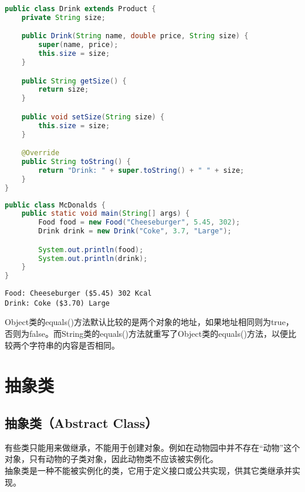 \begin{lstlisting}[language=Java]
public class Drink extends Product {
    private String size;

    public Drink(String name, double price, String size) {
        super(name, price);
        this.size = size;
    }

    public String getSize() {
        return size;
    }

    public void setSize(String size) {
        this.size = size;
    }

    @Override
    public String toString() {
        return "Drink: " + super.toString() + " " + size;
    }
}
\end{lstlisting}

\begin{lstlisting}[language=Java]
public class McDonalds {
    public static void main(String[] args) {
        Food food = new Food("Cheeseburger", 5.45, 302);
        Drink drink = new Drink("Coke", 3.7, "Large");

        System.out.println(food);
        System.out.println(drink);
    }
}
\end{lstlisting}

\begin{tcolorbox}
    \begin{verbatim}
Food: Cheeseburger ($5.45) 302 Kcal
Drink: Coke ($3.70) Large
	\end{verbatim}
\end{tcolorbox}

Object类的equals()方法默认比较的是两个对象的地址，如果地址相同则为true，否则为false。而String类的equals()方法就重写了Object类的equals()方法，以便比较两个字符串的内容是否相同。\\

\newpage

\section{抽象类}

\subsection{抽象类（Abstract Class）}

有些类只能用来做继承，不能用于创建对象。例如在动物园中并不存在“动物”这个对象，只有动物的子类对象，因此动物类不应该被实例化。\\

抽象类是一种不能被实例化的类，它用于定义接口或公共实现，供其它类继承并实现。

